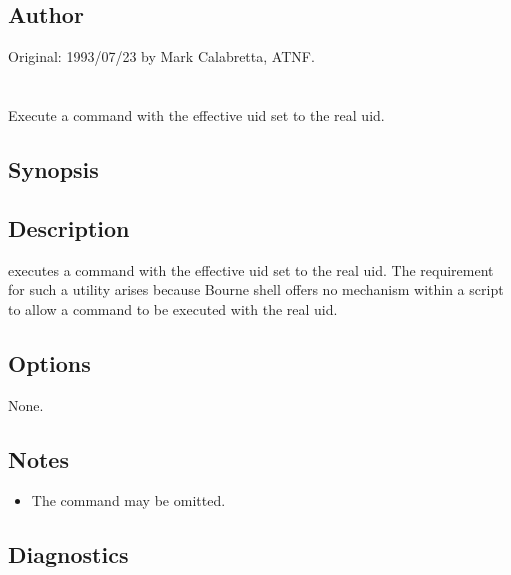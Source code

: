 \subsection*{Author}

Original: 1993/07/23 by Mark Calabretta, ATNF.

 
\newpage
\section{}
\label{asme}
 
Execute a command with the effective uid set to the real uid.

\subsection*{Synopsis}
 
\begin{synopsis}
\end{synopsis}
 
\subsection*{Description}
 
 executes a command with the effective uid set to the real uid.  The
requirement for such a utility arises because Bourne shell offers no mechanism
within a  script to allow a command to be executed with the real
uid.
 
\subsection*{Options}
 
None.
 
\subsection*{Notes}
 
\begin{itemize}
\item
   The command may be omitted.
\end{itemize}
 
\subsection*{Diagnostics}
 
